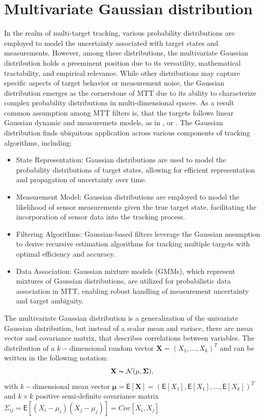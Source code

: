     \section{Multivariate Gaussian distribution}
In the realm of multi-target tracking, various probability distributions are employed to model the uncertainty associated with target states and measurements. However, among these distributions, the multivariate Gaussian distribution holds a preeminent position due to its versatility, mathematical tractability, and empirical relevance. While other distributions may capture specific aspects of target behavior or measurement noise, the Gaussian distribution emerges as the cornerstone of MTT due to its ability to characterize complex probability distributions in multi-dimensional spaces. As a result common assumption among MTT filters is, that the targets follows linear Gaussian dynamic and measuremets models, as in \cite{bar1995}, \cite{GarciaPMBM2018} or \cite{VoMaPHD2006}. The Gaussian distribution finds ubiquitous application across various components of tracking algorithms, including:
\begin{itemize}
    \item State Representation: Gaussian distributions are used to model the probability distributions of target states, allowing for efficient representation and propagation of uncertainty over time.
    \item Measurement Model: Gaussian distributions are employed to model the likelihood of sensor measurements given the true target state, facilitating the incorporation of sensor data into the tracking process.
    \item Filtering Algorithms: Gaussian-based filters leverage the Gaussian assumption to derive recursive estimation algorithms for tracking multiple targets with optimal efficiency and accuracy.
    \item Data Association: Gaussian mixture models (GMMs), which represent mixtures of Gaussian distributions, are utilized for probabilistic data association in MTT, enabling robust handling of measurement uncertainty and target ambiguity.
\end{itemize}
\begin{note}
The multivariate Gaussian distribution is a generalization of the univariate Gaussian distribution, but instead of a scalar mean and variace, there are mean vector and covariance matrix, that describes correlations between variables. The distribution of a $k-$dimensional random vector $\mathbf{X} = (X_1,\dots,X_k)^T$ and can be written in the following notation:
\[\mathbf{X} \thicksim \mathcal{N}(\mathbf{\mu}, \mathbf{\Sigma}),\]
with
$k-$dimensional mean vector
$\mathbf{\mu} = \mathsf{E}[\mathbf{X}] = (\mathsf{E}[X_1], \mathsf{E}[X_1], \dots, \mathsf{E}[X_k])^T$
and
$k\times k$ positive semi-definite covariance matrix
$\mathsf{\Sigma}_{ij} = \mathsf{E}[(X_i - \mu_i)(X_j - \mu_j)] = Cov[X_i, X_j]$
\end{note}
